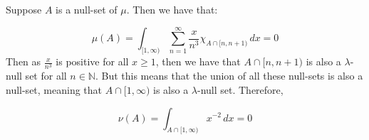 \documentclass{article}
\theoremstyle{definition}
\numberwithin{theorem}{section}
\numberwithin{equation}{section}
\begin{document}
Suppose $A$ is a null-set of $\mu$. Then we have that:

\begin{equation}
	\mu(A) = \int_{[1, \infty)}\sum_{n = 1}^{\infty} \frac{x}{n^3} \chi_{A\cap [n, n + 1)} \, dx  = 0
\end{equation}
Then as $\frac{x}{n^3}$ is positive for all $x \geq 1$, then we have that $A \cap [n, n + 1)$ is also a $\lambda$-null set for all $n \in \mathbb{N}$. But this means that the union of all these null-sets is also a null-set, meaning that $A \cap [1, \infty)$ is also a $\lambda$-null set. Therefore, 

\begin{equation}
	\nu(A) = \int_{A \cap [1, \infty)} x^{-2} \, dx = 0
\end{equation}
\end{document}
